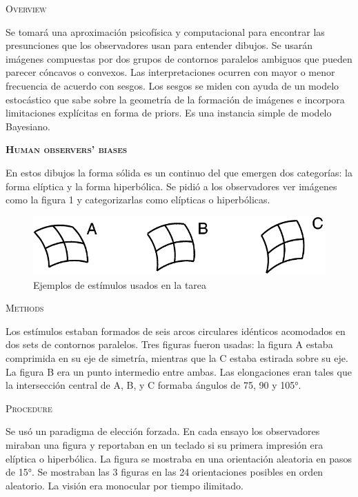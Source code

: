 \documentclass[a4paper,12pt]{article}
\begin{document}
{\scshape Overview}

Se tomará una aproximación psicofísica y computacional para encontrar las presunciones que los observadores usan para entender dibujos. Se usarán imágenes compuestas por dos grupos de contornos paralelos ambiguos que pueden parecer cóncavos o convexos. Las interpretaciones ocurren con mayor o menor frecuencia de acuerdo con sesgos. Los sesgos se miden con ayuda de un modelo estocástico que sabe sobre la geometría de la formación de imágenes e incorpora limitaciones explícitas en forma de priors. Es una instancia simple de modelo Bayesiano.

{\scshape\bfseries Human observers' biases}

En estos dibujos la forma sólida es un continuo del que emergen dos categorías: la forma elíptica y la forma hiperbólica. Se pidió a los observadores ver imágenes como la figura 1 y categorizarlas como elípticas o hiperbólicas. 

\begin{figure}[hb]
	\begin{center}
		\includegraphics[scale=0.5]{Mamassian1998(1).png}
		\caption{Ejemplos de estímulos usados en la tarea}
	\end{center}
\end{figure}

{\scshape Methods}

Los estímulos estaban formados de seis arcos circulares idénticos acomodados en dos sets de contornos paralelos. Tres figuras fueron usadas: la figura A estaba comprimida en su eje de simetría, mientras que la C estaba estirada sobre su eje. La figura B era un punto intermedio entre ambas. Las elongaciones eran tales que la intersección central de A, B, y C formaba ángulos de 75, 90 y 105°. 

{\scshape Procedure}

Se usó un paradigma de elección forzada. En cada ensayo los observadores miraban una figura y reportaban en un teclado si su primera impresión era elíptica o hiperbólica. La figura se mostraba en una orientación aleatoria en pasos de 15°. Se mostraban las 3 figuras en las 24 orientaciones posibles en orden aleatorio. La visión era monocular por tiempo ilimitado.
\end{document}
